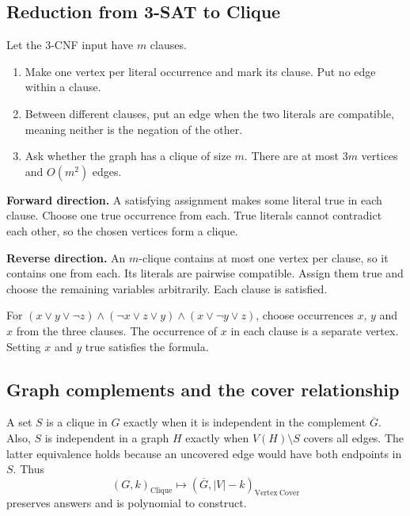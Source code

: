 \documentclass[12pt,a4paper]{article}
\begin{document}
\subsection{Reduction from 3-SAT to Clique}
\begin{tcolorbox}[examplebox, title={Literal-occurrence graph}]
Let the 3-CNF input have $m$ clauses.
\begin{enumerate}[leftmargin=*, itemsep=3pt, topsep=4pt]
  \item Make one vertex per literal occurrence and mark its clause. Put no edge within a clause.
  \item Between different clauses, put an edge when the two literals are compatible, meaning neither is the negation of the other.
  \item Ask whether the graph has a clique of size $m$. There are at most $3m$ vertices and $O(m^2)$ edges.
\end{enumerate}
\textbf{Forward direction.} A satisfying assignment makes some literal true in each clause. Choose one true occurrence from each. True literals cannot contradict each other, so the chosen vertices form a clique.
\par
\textbf{Reverse direction.} An $m$-clique contains at most one vertex per clause, so it contains one from each. Its literals are pairwise compatible. Assign them true and choose the remaining variables arbitrarily. Each clause is satisfied.
\par
For $(x\lor y\lor\neg z)\land(\neg x\lor z\lor y)\land(x\lor\neg y\lor z)$, choose occurrences $x$, $y$ and $x$ from the three clauses. The occurrence of $x$ in each clause is a separate vertex. Setting $x$ and $y$ true satisfies the formula.
\end{tcolorbox}

\subsection{Graph complements and the cover relationship}
A set $S$ is a clique in $G$ exactly when it is independent in the complement $\overline G$. Also, $S$ is independent in a graph $H$ exactly when $V(H)\setminus S$ covers all edges. The latter equivalence holds because an uncovered edge would have both endpoints in $S$. Thus
\[
(G,k)_{\mathrm{Clique}}\mapsto
(\overline G,|V|-k)_{\mathrm{Vertex\ Cover}}
\]
preserves answers and is polynomial to construct.
\end{document}
